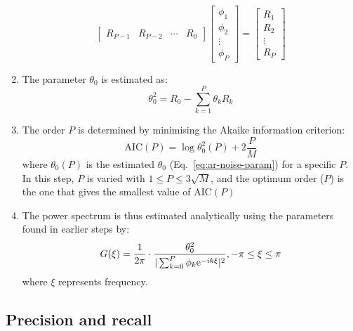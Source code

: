 \begin{enumerate}
\begin{equation}
\begin{bmatrix}
            R_{P-1} & R_{P-2} & \cdots & R_{0}
          \end{bmatrix}
          \begin{bmatrix}
            \phi_{1} \\
            \phi_{2} \\
            \vdots \\
            \phi_{P}
          \end{bmatrix}
          =
          \begin{bmatrix}
            R_{1} \\
            R_{2} \\
            \vdots \\
            R_{P}
          \end{bmatrix}
        \end{equation}
  \item The parameter $\theta_{0}$ is estimated as:
        \begin{equation}
          \label{eq:ar-noise-param}
          \theta_{0}^{2} = R_{0} - \sum_{k=1}^{P}\theta_{k}R_{k}
        \end{equation}
  \item The order $P$ is determined by minimising the Akaike information criterion:
        \begin{equation}
          \label{eq:ar-aic}
          \mathrm{AIC}(P) = \log \theta_{0}^{2}(P) + 2 \frac{P}{M}
        \end{equation}
        where $\theta_{0}(P)$ is the estimated $\theta_{0}$ (Eq.\ \ref{eq:ar-noise-param}) for a specific $P$.
        In this step, $P$ is varied with $1 \leq P \leq 3 \sqrt{M}$, and the optimum order ($P$) is the one that gives the smallest value of $\mathrm{AIC}(P)$
   \item The power spectrum is thus estimated analytically using the parameters found in earlier steps by:
        \begin{equation}
          \label{eq:ar-power-spectrum}
          G(\xi) = \frac{1}{2 \pi} \cdot \frac{\theta_{0}^{2}}{|\sum_{k=0}^{P}\phi_{k}\mathrm{e}^{-ik\xi}|^{2}}, -\pi \leq \xi \leq \pi
        \end{equation}
        where $\xi$ represents frequency.
\end{enumerate}


\subsection{Precision and recall}
\label{subsec:methods-computational-precision-recall}

